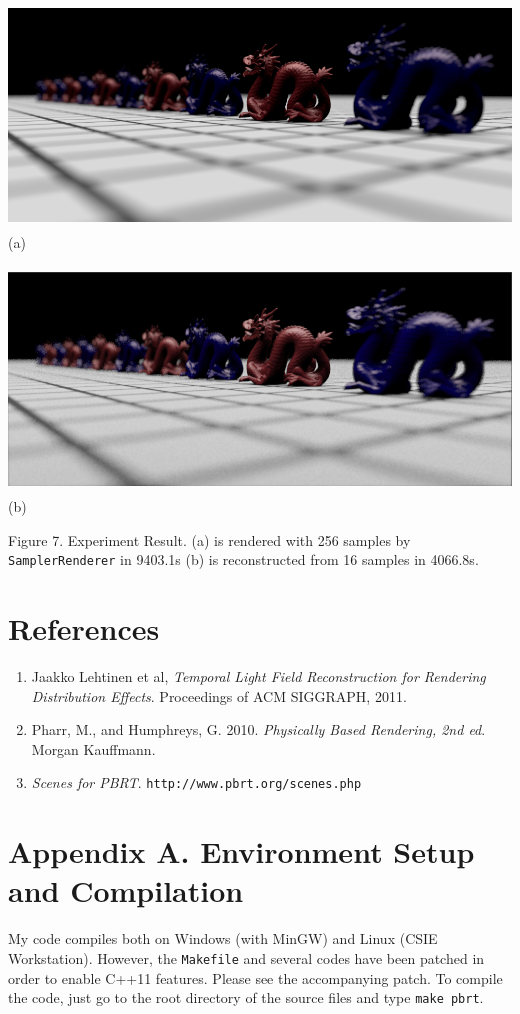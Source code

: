 \documentclass{article}
\begin{document}
\begin{center}

  \includegraphics[width=400pt,height=169.6pt]{./dof-dragons-orig-256.png} \small{(a)}

  \includegraphics[width=400pt,height=169.6pt]{./real-dragons-16-256-10-1-0.png} \small{(b)}

  \small{Figure 7. Experiment Result. (a) is rendered with 256 samples by \texttt{SamplerRenderer} in 9403.1s (b) is reconstructed from 16 samples in 4066.8s.}
\end{center}

\section{References}
\begin{enumerate}
\item Jaakko Lehtinen et al, \textit{Temporal Light Field Reconstruction for Rendering Distribution Effects}. Proceedings of ACM SIGGRAPH, 2011.
\item Pharr, M., and Humphreys, G. 2010. \textit{Physically Based Rendering, 2nd ed}. Morgan Kauffmann.
\item \textit{Scenes for PBRT}. \texttt{http://www.pbrt.org/scenes.php}

\end{enumerate}
\section*{Appendix A. Environment Setup and Compilation}
My code compiles both on Windows (with MinGW) and Linux (CSIE Workstation). However, the \texttt{Makefile} and several codes have been patched in order to enable C++11 features. Please see the accompanying patch. To compile the code, just go to the root directory of the source files and type \texttt{make pbrt}.
\end{document}
